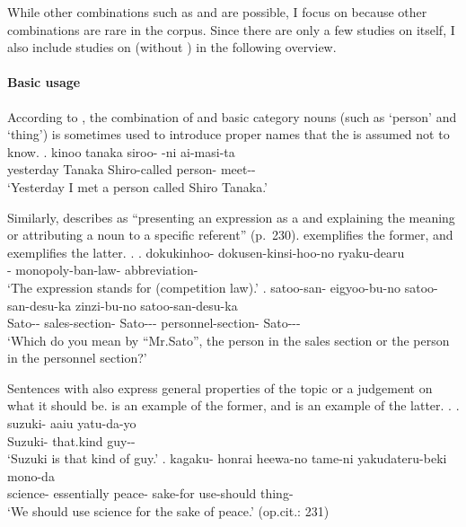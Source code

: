 While other combinations such as  and  are possible,
I focus on  because other combinations are rare in the corpus.
Since there are only a few studies on  itself,
I also include studies on  (without ) in the following overview.

\paragraph{Basic usage}

According to ,
the combination of
 and basic category nouns (such as  `person' and  `thing') is sometimes used to introduce proper names that the  is assumed not to know.
%
\exg. kinoo tanaka siroo- -ni ai-masi-ta \\
	yesterday Tanaka Shiro-called person- meet-- \\
	`Yesterday I met a person called Shiro Tanaka.'
	\hfill{\cite[][p.\ 218]{takubo89}}


Similarly,  describes  as
``presenting an expression as a  and explaining the meaning or
attributing a noun to a specific referent'' (p.~230).
\Next[a] exemplifies the former, and
\Next[b] exemplifies the latter.
%
\ex.
 \ag. dokukinhoo- dokusen-kinsi-hoo-no ryaku-dearu \\
      - monopoly-ban-law- abbreviation- \\
      `The expression  stands for  (competition law).'
 \bg. satoo-san- eigyoo-bu-no satoo-san-desu-ka zinzi-bu-no satoo-san-desu-ka\\
      Sato-- sales-section- Sato--- personnel-section- Sato---\\
      `Which do you mean by ``Mr.Sato'', the person in the sales section or the person in the personnel section?'
      \hfill{\cite[230]{kijutubumpokenkyukai09}}


Sentences with  also express
general properties of the topic or a judgement on what it should be.
\Next[a] is an example of the former, and
\Next[b] is an example of the latter.
%
\ex.
 \ag. suzuki- aaiu yatu-da-yo \\
      Suzuki- that.kind guy-- \\
      `Suzuki is that kind of guy.'
 \bg. kagaku- honrai heewa-no tame-ni yakudateru-beki mono-da \\
      science- essentially peace- sake-for use-should thing- \\
      `We should use science for the sake of peace.'
      \hfill{(op.cit.: 231)}



